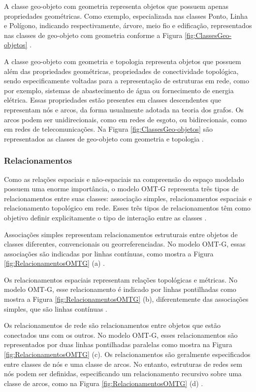 A classe geo-objeto com geometria representa objetos que possuem apenas propriedades geométricas. Como exemplo, especializada nas classes Ponto, Linha e Polígono, indicando respectivamente, árvore, meio fio e edificação, representados nas classes de geo-objeto com geometria conforme a Figura \ref{fig:ClassesGeo-objetos} \cite{omtg}.

A classe geo-objeto com geometria e topologia representa objetos que possuem além das propriedades geométricas, propriedades de conectividade topológica, sendo especificamente voltadas para a representação de estruturas em rede, como por exemplo, sistemas de abastecimento de água ou fornecimento de energia elétrica. Essas propriedades estão presentes em classes descendentes que representam nós e arcos, da forma usualmente adotada na teoria dos grafos. Os arcos podem ser unidirecionais, como em redes de esgoto, ou bidirecionais, como em redes de telecomunicações. Na Figura \ref{fig:ClassesGeo-objetos} são representados as classes de geo-objeto com geometria e topologia \cite{omtg}.

\subsubsection{Relacionamentos}

Como as relações espaciais e não-espaciais na compreensão do espaço modelado possuem uma enorme importância, o modelo OMT-G representa três tipos de relacionamentos entre suas classes: associação simples, relacionamentos espaciais e relacionamento topológico em rede. Esses três tipos de relacionamentos têm como objetivo definir explicitamente o tipo de interação entre as classes \cite{omtg}.

Associações simples representam relacionamentos estruturais entre objetos de classes diferentes, convencionais ou georreferenciadas. No modelo OMT-G, essas associações são indicadas por linhas contínuas, como mostra a Figura \ref{fig:RelacionamentosOMTG} (a) \cite{omtg}.

Os relacionamentos espaciais representam relações topológicas e métricas. No modelo OMT-G, esse relacionamento é indicado por linhas pontilhadas como mostra a Figura \ref{fig:RelacionamentosOMTG} (b), diferentemente das associações simples, que são linhas contínuas \cite{omtg}.

\newpage

Os relacionamentos de rede são relacionamentos entre objetos que estão conectados uns com os outros. No modelo OMT-G, esses relacionamentos são representados por duas linhas pontilhadas paralelas como mostra na Figura \ref{fig:RelacionamentosOMTG} (c). Os relacionamentos são geralmente especificados entre classes de nós e uma classe de arcos. No entanto, estruturas de redes sem nós podem ser definidas, especificando um relacionamento recursivo sobre uma classe de arcos, como na Figura \ref{fig:RelacionamentosOMTG} (d) \cite{omtg}.

